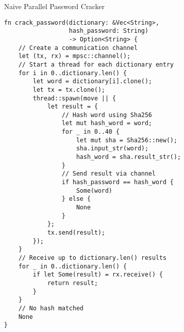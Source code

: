 \documentclass[conference]{IEEEtran}
\begin{document}
\begin{algorithm}
\caption{Naive Parallel Password Cracker}
\label{code:par-naive-password}
\begin{verbatim}
fn crack_password(dictionary: &Vec<String>,
                  hash_password: String)
                  -> Option<String> {
    // Create a communication channel
    let (tx, rx) = mpsc::channel();
    // Start a thread for each dictionary entry
    for i in 0..dictionary.len() {
        let word = dictionary[i].clone();
        let tx = tx.clone();
        thread::spawn(move || {
            let result = {
                // Hash word using Sha256
                let mut hash_word = word;
                for _ in 0..40 {
                    let mut sha = Sha256::new();
                    sha.input_str(word);
                    hash_word = sha.result_str();
                }
                // Send result via channel
                if hash_password == hash_word {
                    Some(word)
                } else {
                    None
                }
            };
            tx.send(result);
        });
    }
    // Receive up to dictionary.len() results
    for _ in 0..dictionary.len() {
        if let Some(result) = rx.receive() {
            return result;
        }
    }
    // No hash matched
    None
}
\end{verbatim}
\end{algorithm}

\begin{comment}
\begin{algorithm}
\caption{Refactored Sequential Password Cracker}
\label{code:seq-refactor-password}
\begin{verbatim}
fn crack_password(dictionary: &Vec<String>,
                  hash_password: String)
                  -> Option<String> {
    let mut hashes = vec![];
    for word in dictionary {
        // Hash word using Sha256
        let mut hash_word = word;
        for _ in 0..40 {
            let mut sha = Sha256::new();
            sha.input_str(word);
            hash_word = sha.result_str();
        }
        hashes.push(hash_word);
    }
    // Check if hash matches
    for hash_word in hashes {
        if hash_password == hash_word {
            return Some(word.clone());
        }
    }
    // No hash matched
    None
}
\end{verbatim}
\end{algorithm}
\end{comment}
\end{document}
